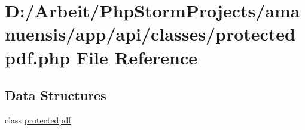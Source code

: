 \hypertarget{a00071}{}\section{D\+:/\+Arbeit/\+Php\+Storm\+Projects/amanuensis/app/api/classes/protectedpdf.php File Reference}
\label{a00071}
\subsection*{Data Structures}
\begin{DoxyCompactItemize}
\item 
class \hyperlink{a00037}{protectedpdf}
\end{DoxyCompactItemize}
